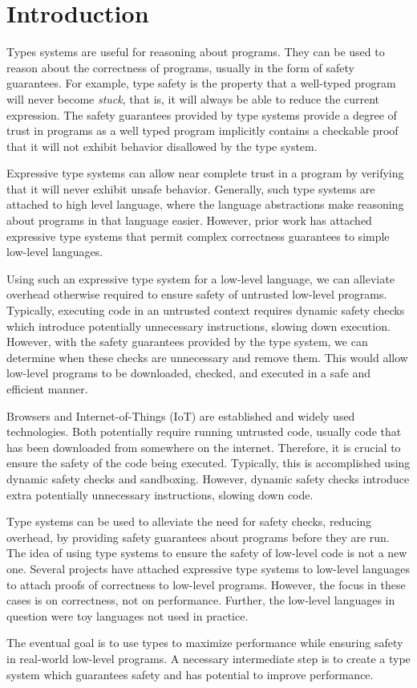 \chapter{Introduction}
\label{chp:intro}

Types systems are useful for reasoning about programs.
They can be used to reason about the correctness of programs, usually in the form of safety guarantees.
For example, type safety is the property that a well-typed program will never become \emph{stuck}, that is, it will always be able to reduce the current expression. %
The safety guarantees provided by type systems provide a degree of trust in programs as a well typed program implicitly contains a checkable proof that it will not exhibit behavior disallowed by the type system.

Expressive type systems can allow near complete trust in a program by verifying that it will never exhibit unsafe behavior.
Generally, such type systems are attached to high level language, where the language abstractions make reasoning about programs in that language easier.
However, prior work has attached expressive type systems that permit complex correctness guarantees to simple low-level languages.

Using such an expressive type system for a low-level language, we can alleviate overhead otherwise required to ensure safety of untrusted low-level programs.
Typically, executing code in an untrusted context requires dynamic safety checks which introduce potentially unnecessary instructions, slowing down execution.
However, with the safety guarantees provided by the type system, we can determine when these checks are unnecessary and remove them.
This would allow low-level programs to be downloaded, checked, and executed in a safe and efficient manner.

Browsers and Internet-of-Things (IoT) are established and widely used technologies.
Both potentially require running untrusted code, usually code that has been downloaded from somewhere on the internet.
Therefore, it is crucial to ensure the safety of the code being executed.
Typically, this is accomplished using dynamic safety checks and sandboxing.
However, dynamic safety checks introduce extra potentially unnecessary instructions, slowing down code.


Type systems can be used to alleviate the need for safety checks, reducing overhead, by providing safety guarantees about programs before they are run.
The idea of using type systems to ensure the safety of low-level code is not a new one.
Several projects have attached expressive type systems to low-level languages to attach proofs of correctness to low-level programs.
However, the focus in these cases is on correctness, not on performance.
Further, the low-level languages in question were toy languages not used in practice.

The eventual goal is to use types to maximize performance while ensuring safety in real-world low-level programs.
A necessary intermediate step is to create a type system which guarantees safety and has potential to improve performance.
